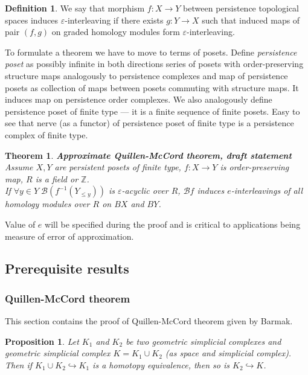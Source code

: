 \documentclass[a4paper, 12pt]{article}
\newtheorem{proposition}{Proposition}
\newtheorem{theorem}{Theorem}
\theoremstyle{definition}
\newtheorem{definition}{Definition}
\theoremstyle{remark}
\newcommand{\define}[1]{{\textit{#1}}}
\begin{document}
\begin{definition}
  We say that morphism $f : X \to Y$ between persistence topological spaces induces $\varepsilon$-interleaving if there exists $g : Y \to X$ such that induced maps of pair $(f,g)$ on graded homology modules form $\varepsilon$-interleaving.
\end{definition}

To formulate a theorem we have to move to terms of posets. Define \define{persistence poset} as possibly infinite in both directions series of posets with order-preserving structure maps analogously to persistence complexes and map of persistence posets as collection of maps between posets commuting with structure maps. It induces map on persistence order complexes. We also analogously define persistence poset of finite type --- it is a finite sequence of finite posets. Easy to see that nerve (as a functor) of persistence poset of finite type is a persistence complex of finite type.\\

\begin{theorem} \textbf{Approximate Quillen-McCord theorem, draft statement}\\
  Assume $X, Y$ are persistent posets of finite type, $f : X \to Y$ is order-preserving map, $R$ is a field or $\mathbb{Z}$.\\
  If $\forall y \in Y\;\mathcal{B}(f^{-1}(Y_{\leqslant y}))$ is $\varepsilon$-acyclic over $R$, $\mathcal{B}f$ induces $e$-interleavings of all homology modules over $R$ on $BX$ and $BY$.\\
\end{theorem}

Value of $e$ will be specified during the proof and is critical to applications being measure of error of approximation.

\subsection{Prerequisite results}

\subsubsection{Quillen-McCord theorem}

This section contains the proof of Quillen-McCord theorem given by Barmak.

\begin{proposition} {\cite[Proposition 2.1]{Bar11}}
  Let $K_1$ and $K_2$ be two geometric simplicial complexes and geometric simplicial complex $K = K_1 \cup K_2$ (as space and simplicial complex). Then if $K_1 \cup K_2 \hookrightarrow K_1$ is a homotopy equivalence, then so is $K_2 \hookrightarrow K$.
\end{proposition}
\end{document}
